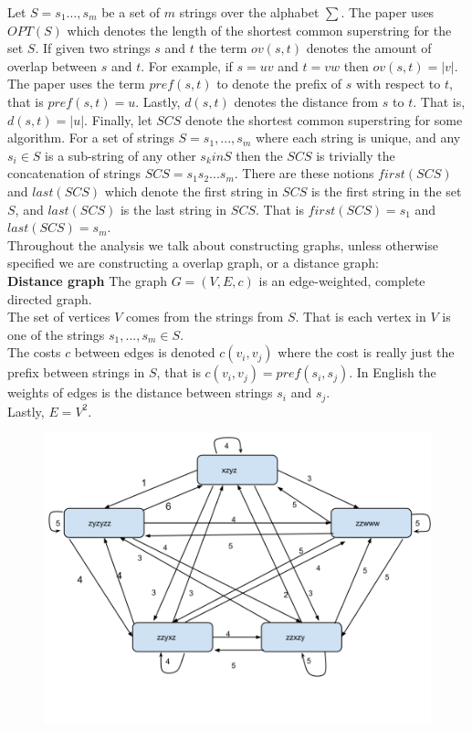 \documentclass[letterpaper,11pt,titlepage]{article}
\begin{document}
Let $S = {s_1 \ldots, s_m}$ be a set of $m$ strings over the alphabet $\sum$. The paper uses $OPT(S)$ which denotes the length of the shortest common superstring for the set $S$. If given two strings $s$ and $t$ the term $ov(s,t)$ denotes the amount of overlap between $s$ and $t$. For example, if $s = uv$ and $t = vw$ then $ov(s,t) = |v|$. The paper uses the term $pref(s,t)$ to denote the prefix of $s$ with respect to $t$, that is $pref(s,t) = u$. Lastly, $d(s,t)$ denotes the distance from $s$ to $t$. That is, $d(s,t) = |u|$. Finally, let $SCS$ denote the shortest common superstring for some algorithm. For a set of strings $S = {s_1, ..., s_m}$ where each string is unique, and any $s_i \in S$ is a sub-string of any other $s_k in S$ then the $SCS$ is trivially the concatenation of strings $SCS = s_1s_2...s_m$. There are these notions $first(SCS)$ and $last(SCS)$ which denote the first string in $SCS$ is the first string in the set $S$, and $last(SCS)$ is the last string in $SCS$. That is $first(SCS) = s_1$ and $last(SCS) = s_m$. \\

Throughout the analysis we talk about constructing graphs, unless otherwise specified we are constructing a overlap graph, or a distance graph:\\

\textbf{Distance graph}
The graph $G = (V,E,c)$ is an edge-weighted, complete directed graph. \\
The set of vertices $V$ comes from the strings from $S$. That is each vertex in $V$ is one of the strings $s_1, ..., s_m \in S$.\\
The costs $c$ between edges is denoted $c(v_i,v_j)$ where the cost is really just the prefix between strings in $S$, that is $c(v_i,v_j) = pref(s_i,s_j)$. In English the weights of edges is the distance between strings $s_i$ and $s_j$.\\
Lastly, $E=V^2$.\\

\begin{figure}[h]
 \centering
   \includegraphics[width=.4\textwidth]{distance.png}
\end{figure}
\end{document}
